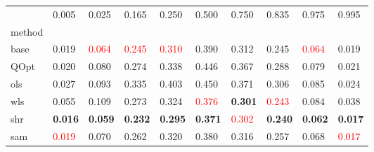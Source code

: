\begin{tabular}{llllllllll}
\toprule
 & 0.005 & 0.025 & 0.165 & 0.250 & 0.500 & 0.750 & 0.835 & 0.975 & 0.995 \\
method &  &  &  &  &  &  &  &  &  \\
\midrule
base & 0.019 & \textcolor{red}{0.064} & \textcolor{red}{0.245} & \textcolor{red}{0.310} & 0.390 & 0.312 & 0.245 & \textcolor{red}{0.064} & 0.019 \\
QOpt & 0.020 & 0.080 & 0.274 & 0.338 & 0.446 & 0.367 & 0.288 & 0.079 & 0.021 \\
ols & 0.027 & 0.093 & 0.335 & 0.403 & 0.450 & 0.371 & 0.306 & 0.085 & 0.024 \\
wls & 0.055 & 0.109 & 0.273 & 0.324 & \textcolor{red}{0.376} & \textbf{0.301} & \textcolor{red}{0.243} & 0.084 & 0.038 \\
shr & \textbf{0.016} & \textbf{0.059} & \textbf{0.232} & \textbf{0.295} & \textbf{0.371} & \textcolor{red}{0.302} & \textbf{0.240} & \textbf{0.062} & \textbf{0.017} \\
sam & \textcolor{red}{0.019} & 0.070 & 0.262 & 0.320 & 0.380 & 0.316 & 0.257 & 0.068 & \textcolor{red}{0.017} \\
\bottomrule
\end{tabular}
